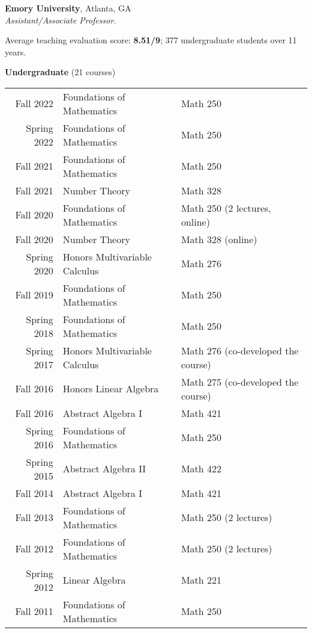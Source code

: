 \documentclass[margin,line]{res}
\newcommand{\defi}[1]{\textsf{#1}} 				%
\begin{document}
\begin{resume}
{\bf Emory University}, Atlanta, GA\\
\emph{Assistant/Associate Professor}. 
\vspace{2pt}

Average teaching evaluation score: \textbf{8.51/9}; 377 undergraduate students over 11 years. 
\vspace{2pt}



{\bf Undergraduate} (21 courses)
\vspace*{-.1in}

\begin{tabular}{rll}
 Fall 2022 & \defi{Foundations of Mathematics} & Math 250\\  
 Spring 2022 & \defi{Foundations of Mathematics} & Math 250\\
 Fall 2021 & \defi{Foundations of Mathematics} & Math 250  \\
 Fall 2021 & \defi{Number Theory} & Math 328   \\   
 Fall 2020 & \defi{Foundations of Mathematics} & Math 250 (2 lectures, online) \\
 Fall 2020 & \defi{Number Theory} & Math 328 (online)  \\    
 Spring 2020 & \defi{Honors Multivariable Calculus} & Math 276 \\
 Fall 2019 & \defi{Foundations of Mathematics} & Math 250 \\
 Spring 2018 & \defi{Foundations of Mathematics} & Math 250 \\
 Spring 2017 & \defi{Honors Multivariable Calculus} & Math 276  (co-developed the course) \\
 Fall 2016 & \defi{Honors Linear Algebra} & Math 275 (co-developed the course) \\
 Fall 2016 & \defi{Abstract Algebra I} & Math 421 \\
 Spring 2016 & \defi{Foundations of Mathematics} & Math 250 \\
 Spring 2015 & \defi{Abstract Algebra II} & Math 422 \\
 Fall 2014 & \defi{Abstract Algebra I} & Math 421 \\
 Fall 2013 & \defi{Foundations of Mathematics} & Math 250 (2 lectures) \\
 Fall 2012 & \defi{Foundations of Mathematics} & Math 250 (2 lectures) \\
 Spring 2012 & \defi{Linear Algebra} & Math 221 \\
 Fall 2011 & \defi{Foundations of Mathematics} & Math 250 \\
\end{tabular}


\end{resume}
\end{document}
